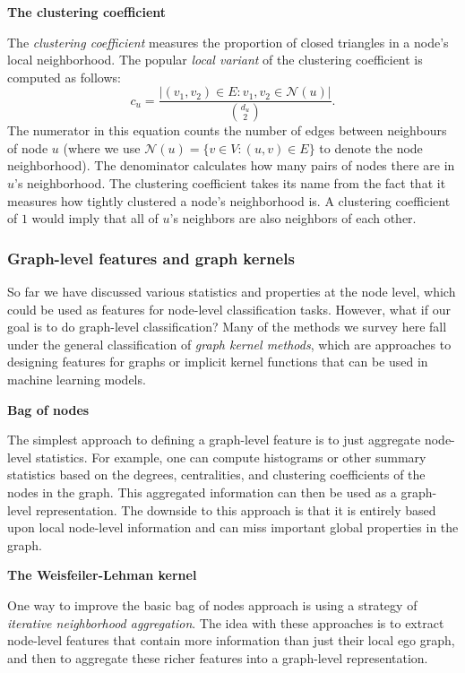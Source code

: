 \documentclass[10pt]{book}
\let\defaultmarginpar\marginpar
\renewcommand\marginpar[2][]{\defaultmarginpar{\itshape\color{gray}#2}}
\begin{document}
\textbf{The clustering coefficient}

The \emph{clustering coefficient}\marginpar{clustering coefficient} measures the proportion of closed triangles in a node's local neighborhood. The popular \emph{local variant} of the clustering coefficient is computed as follows:
\begin{equation}
    c_u = \frac{|(v_1, v_2) \in E: v_1, v_2 \in \mathcal N(u)|}{\binom{d_u}2}.
\end{equation}
The numerator in this equation counts the number of edges between neighbours of node $u$ (where we use $\mathcal N(u) = \{v \in V: (u, v) \in E\}$ to denote the node neighborhood). The denominator calculates how many pairs of nodes there are in $u$'s neighborhood. The clustering coefficient takes its name from the fact that it measures how tightly clustered a node's neighborhood is. A clustering coefficient of $1$ would imply that all of $u$'s neighbors are also neighbors of each other.

\subsubsection{Graph-level features and graph kernels}

So far we have discussed various statistics and properties at the node level, which could be used as features for node-level classification tasks. However, what if our goal is to do graph-level classification? Many of the methods we survey here fall under the general classification of \emph{graph kernel methods}, which are approaches to designing features for graphs or implicit kernel functions that can be used in machine learning models.
\smallskip

\textbf{Bag of nodes}

The simplest approach to defining a graph-level feature is to just aggregate node-level statistics. For example, one can compute histograms or other summary statistics based on the degrees, centralities, and clustering coefficients of the nodes in the graph. This aggregated information can then be used as a graph-level representation. The downside to this approach is that it is entirely based upon local node-level information and can miss important global properties in the graph.
\smallskip

\textbf{The Weisfeiler-Lehman kernel}

One way to improve the basic bag of nodes approach is using a strategy of \emph{iterative neighborhood aggregation}. The idea with these approaches is to extract node-level features that contain more information than just their local ego graph, and then to aggregate these richer features into a graph-level representation.
\end{document}

